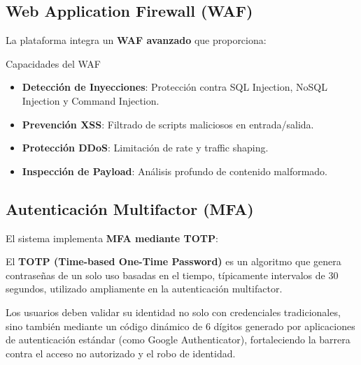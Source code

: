 
\subsection{Web Application Firewall (WAF)}

La plataforma integra un \textbf{WAF avanzado} que proporciona:

\begin{caja}{Capacidades del WAF}
\begin{itemize}
\item \textbf{Detección de Inyecciones}: Protección contra SQL Injection, NoSQL Injection y Command Injection.
\item \textbf{Prevención XSS}: Filtrado de scripts maliciosos en entrada/salida.
\item \textbf{Protección DDoS}: Limitación de rate y traffic shaping.
\item \textbf{Inspección de Payload}: Análisis profundo de contenido malformado.
\end{itemize}
\end{caja}


\subsection{Autenticación Multifactor (MFA)}

El sistema implementa \textbf{MFA mediante TOTP}:

\begin{definicion}
El \textbf{TOTP (Time-based One-Time Password)} es un algoritmo que genera contraseñas de un solo uso basadas en el tiempo, típicamente intervalos de 30 segundos, utilizado ampliamente en la autenticación multifactor.
\end{definicion}


Los usuarios deben validar su identidad no solo con credenciales tradicionales, sino también mediante un código dinámico de 6 dígitos generado por aplicaciones de autenticación estándar (como Google Authenticator), fortaleciendo la barrera contra el acceso no autorizado y el robo de identidad.

